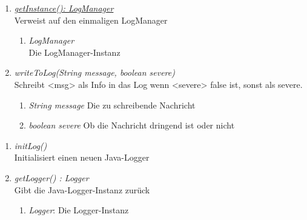 \begin{enumerate}[+]

	\item \underline{\textit{getInstance(): LogManager}} \\
	Verweist auf den einmaligen LogManager
	
	\vspace{-0.2cm}
	\begin{enumerate}[$\circ$]
		\item \textit{LogManager} \\
		Die LogManager-Instanz
	\end{enumerate}

	\item \textit{writeToLog(String message, boolean severe)} \\
	Schreibt <msg> als Info in das Log wenn <severe> false ist, sonst als severe.
	\begin{enumerate}[$\bullet$]
		\item \textit{String message} Die zu schreibende Nachricht
		\item \textit{boolean severe} Ob die Nachricht dringend ist oder nicht
	\end{enumerate}
\end{enumerate}


\begin{enumerate}[$-$]

	\item \textit{initLog()} \\ Initialisiert einen neuen Java-Logger
	\vspace{-0.2cm}

	\item \textit{getLogger() : Logger} \\
	Gibt die Java-Logger-Instanz zurück
	\begin{enumerate}[$\circ$]
		\item \textit{Logger}: Die Logger-Instanz
	\end{enumerate}
\end{enumerate}
	